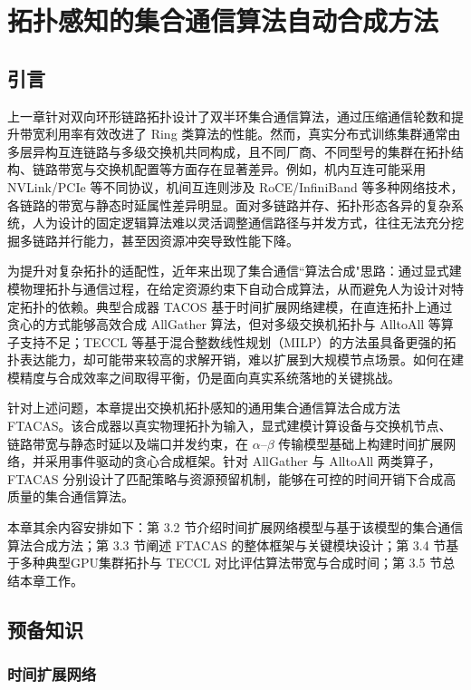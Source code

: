 \chapter{拓扑感知的集合通信算法自动合成方法}
\section{引言}

上一章针对双向环形链路拓扑设计了双半环集合通信算法，通过压缩通信轮数和提升带宽利用率有效改进了 Ring 类算法的性能。然而，真实分布式训练集群通常由多层异构互连链路与多级交换机共同构成，且不同厂商、不同型号的集群在拓扑结构、链路带宽与交换机配置等方面存在显著差异。例如，机内互连可能采用 NVLink/PCIe 等不同协议，机间互连则涉及 RoCE/InfiniBand 等多种网络技术，各链路的带宽与静态时延属性差异明显。面对多链路并存、拓扑形态各异的复杂系统，人为设计的固定逻辑算法难以灵活调整通信路径与并发方式，往往无法充分挖掘多链路并行能力，甚至因资源冲突导致性能下降。

为提升对复杂拓扑的适配性，近年来出现了集合通信“算法合成"思路：通过显式建模物理拓扑与通信过程，在给定资源约束下自动合成算法，从而避免人为设计对特定拓扑的依赖。典型合成器 TACOS 基于时间扩展网络建模，在直连拓扑上通过贪心的方式能够高效合成 AllGather 算法，但对多级交换机拓扑与 AlltoAll 等算子支持不足；TECCL 等基于混合整数线性规划（MILP）的方法虽具备更强的拓扑表达能力，却可能带来较高的求解开销，难以扩展到大规模节点场景。如何在建模精度与合成效率之间取得平衡，仍是面向真实系统落地的关键挑战。

针对上述问题，本章提出交换机拓扑感知的通用集合通信算法合成方法 FTACAS。该合成器以真实物理拓扑为输入，显式建模计算设备与交换机节点、链路带宽与静态时延以及端口并发约束，在 $\alpha$--$\beta$ 传输模型基础上构建时间扩展网络，并采用事件驱动的贪心合成框架。针对 AllGather 与 AlltoAll 两类算子，FTACAS 分别设计了匹配策略与资源预留机制，能够在可控的时间开销下合成高质量的集合通信算法。

本章其余内容安排如下：第 3.2 节介绍时间扩展网络模型与基于该模型的集合通信算法合成方法；第 3.3 节阐述 FTACAS 的整体框架与关键模块设计；第 3.4 节基于多种典型GPU集群拓扑与 TECCL 对比评估算法带宽与合成时间；第 3.5 节总结本章工作。



\section{预备知识}

\subsection{时间扩展网络}


